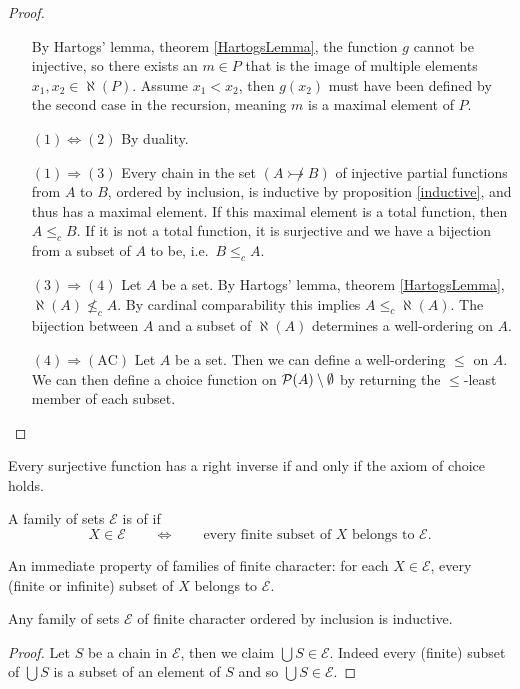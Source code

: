 \begin{proof}
\begin{itemize}[leftmargin=2cm]
By Hartogs' lemma, theorem \ref{HartogsLemma}, the function $g$ cannot be injective, so there exists an $m\in P$ that is the image of multiple elements $x_1,x_2\in\aleph(P)$. Assume $x_1 < x_2$, then $g(x_2)$ must have been defined by the second case in the recursion, meaning $m$ is a maximal element of $P$.
\item[$\boxed{(1) \Leftrightarrow (2)}$] By duality.
\item[$\boxed{(1) \Rightarrow (3)}$] Every chain in the set $(A \not\rightarrowtail B)$ of injective partial functions from $A$ to $B$, ordered by inclusion, is inductive by proposition \ref{inductive}, and thus has a maximal element. If this maximal element is a total function, then $A\leq_c B$. If it is not a total function, it is surjective and we have a bijection from a subset of $A$ to be, i.e.\ $B\leq_c A$.
\item[$\boxed{(3) \Rightarrow (4)}$] Let $A$ be a set. By Hartogs' lemma, theorem \ref{HartogsLemma}, $\aleph(A) \nleq_c A$. By cardinal comparability this implies $A \leq_c \aleph(A)$. The bijection between $A$ and a subset of $\aleph(A)$ determines a well-ordering on $A$.
\item[$\boxed{(4) \Rightarrow (\text{AC})}$] Let $A$ be a set. Then we can define a well-ordering $\leq$ on $A$. We can then define a choice function on $\operatorname{\mathcal{P}}(A)\setminus \emptyset$ by returning the $\leq$-least member of each subset.
\end{itemize}
\end{proof}

\begin{lemma} \label{surjectiveInverse}
Every surjective function has a right inverse \textup{if and only if} the axiom of choice holds.
\end{lemma}

\begin{definition}
A family of sets $\mathcal{E}$ is of  if
\[ X\in \mathcal{E} \qquad \iff \qquad \text{every finite subset of $X$ belongs to $\mathcal{E}$.} \]
\end{definition}
An immediate property of families of finite character: for each $X\in \mathcal{E}$, every (finite or infinite) subset of $X$ belongs to $\mathcal{E}$.

\begin{lemma} \label{finiteCharacterInductive}
Any family of sets $\mathcal{E}$ of finite character ordered by inclusion is inductive.
\end{lemma}
\begin{proof}
Let $S$ be a chain in $\mathcal{E}$, then we claim $\bigcup S \in \mathcal{E}$. Indeed every (finite) subset of $\bigcup S$ is a subset of an element of $S$ and so $\bigcup S\in \mathcal{E}$.
\end{proof}

